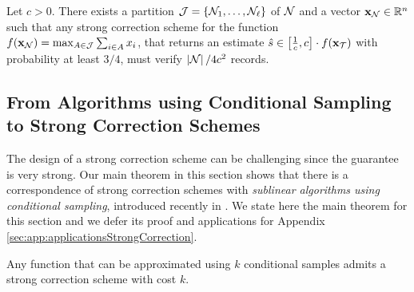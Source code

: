 \begin{lemma} \label{lem:maxOfSumC}
    Let $c >0$. There exists a partition $\mathcal{J} = \{\mathcal{N}_1, \dots, \mathcal{N}_{\ell}\}$ of
  $\mathcal{N}$ and a vector $\mathbf{x}_{\mathcal{N}} \in \mathbb{R}^n$ such that any strong correction scheme for the function 
  $f(\mathbf{x}_{\mathcal{N}}) = \max_{A \in \mathcal{J}} \sum_{i \in A} x_i$, that returns an estimate 
  $\hat{s} \in \left[\frac{1}{c}, c\right] \cdot f(\mathbf{x}_{\mathcal{T}})$ with probability at least $3/4$, must verify
  $\left|\mathcal{N}\right| / 4 c^2$ records.
\end{lemma}



\subsection{From Algorithms using Conditional Sampling to Strong Correction Schemes}

  The design of a strong correction scheme can be challenging since the guarantee is very strong. Our main theorem 
in this section shows that there is a correspondence of strong correction schemes with 
\textit{sublinear algorithms using conditional sampling}, introduced recently in \cite{GouleakisTZ2017}. We state here the main
theorem for this section and we defer its proof and applications for Appendix \ref{sec:app:applicationsStrongCorrection}.

\begin{theorem} \label{thm:sCorrection}
    Any function that can be approximated using $k$ conditional samples admits a strong correction scheme with cost $k$.
\end{theorem}